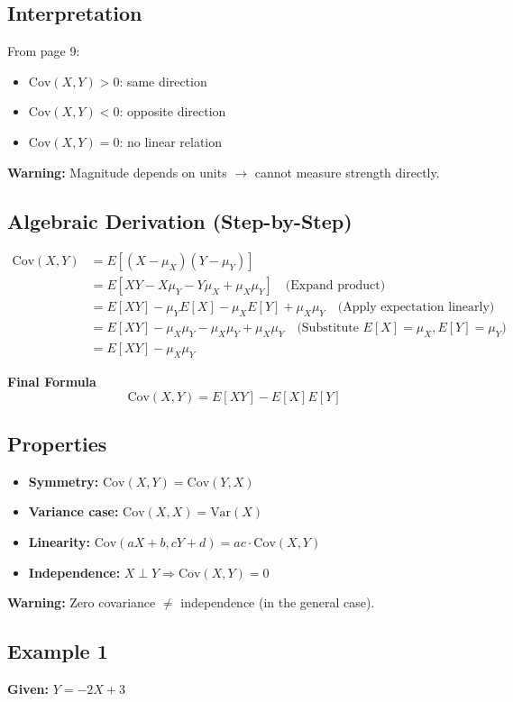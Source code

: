 \documentclass[12pt,a4paper]{article}
\begin{document}
\subsection{Interpretation}
From page 9:
\begin{itemize}
    \item $\text{Cov}(X,Y) > 0$: same direction
    \item $\text{Cov}(X,Y) < 0$: opposite direction
    \item $\text{Cov}(X,Y) = 0$: no linear relation
\end{itemize}
\textbf{Warning:} Magnitude depends on units $\rightarrow$ cannot measure strength directly.

\subsection{Algebraic Derivation (Step-by-Step)}
\begin{align*}
\text{Cov}(X,Y) &= E[(X-\mu_X)(Y-\mu_Y)] \\
&= E[XY - X\mu_Y - Y\mu_X + \mu_X\mu_Y] \quad \text{(Expand product)} \\
&= E[XY] - \mu_Y E[X] - \mu_X E[Y] + \mu_X\mu_Y \quad \text{(Apply expectation linearly)} \\
&= E[XY] - \mu_X\mu_Y - \mu_X\mu_Y + \mu_X\mu_Y \quad \text{(Substitute } E[X]=\mu_X, E[Y]=\mu_Y \text{)} \\
&= E[XY] - \mu_X\mu_Y
\end{align*}

\textbf{Final Formula}
\[
\boxed{\text{Cov}(X,Y) = E[XY] - E[X]E[Y]}
\]

\subsection{Properties}
\begin{itemize}
    \item \textbf{Symmetry:} $\text{Cov}(X,Y)=\text{Cov}(Y,X)$
    \item \textbf{Variance case:} $\text{Cov}(X,X)=\text{Var}(X)$
    \item \textbf{Linearity:} $\text{Cov}(aX+b, cY+d)=ac \cdot \text{Cov}(X,Y)$
    \item \textbf{Independence:} $X \perp Y \Rightarrow \text{Cov}(X,Y)=0$
\end{itemize}
\textbf{Warning:} Zero covariance $\neq$ independence (in the general case).

\subsection{Example 1}
\textbf{Given:} $Y = -2X + 3$
\end{document}
